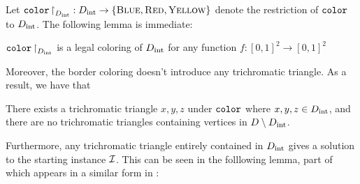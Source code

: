   Let $\operatorname{\texttt{color}}\mathord{\upharpoonright}_{D_{\mathrm{int}}} : D_{\mathrm{int}} \to \left\{ \textsc{Blue}, \textsc{Red}, \textsc{Yellow} \right\}$ denote the restriction of $\operatorname{\texttt{color}}$ to $D_{\mathrm{int}}$. The following lemma is immediate:
  \begin{lemma}
    $\operatorname{\texttt{color}}\mathord{\upharpoonright}_{D_{\mathrm{int}}}$ is a legal coloring of $D_{\mathrm{int}}$ for any function $f: [0,1]^2\to [0,1]^2$
  \end{lemma}

  Moreover, the border coloring doesn't introduce any trichromatic triangle. As a result, we have that
  \begin{lemma}
    There exists a trichromatic triangle $x,y,z$ under $\operatorname{\texttt{color}}$ where $x,y,z\in D_{\mathrm{int}}$, and there are no trichromatic triangles containing vertices in $D\setminus D_{\mathrm{int}}$.
  \end{lemma}

  Furthermore, any trichromatic triangle entirely contained in $D_{\mathrm{int}}$ gives a solution to the starting instance $\mbox{${\mathcal I}$}$. This can be seen in the folllowing lemma, part of which appears in a similar form in \cite{scarf1967approximation}:

